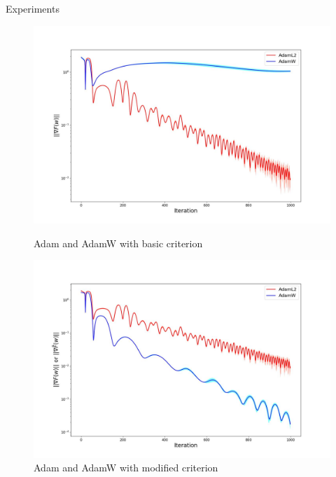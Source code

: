 \documentclass[aspectratio=169, 12pt]{beamer}
\begin{document}
\begin{frame}{Experiments}
\begin{figure}[H]
\begin{minipage}[h]{0.49\linewidth}
\centering

\includegraphics[width=\linewidth]{fig1.jpg}

\caption{Adam and AdamW with basic criterion}
\label{fig:adams_errors}
\end{minipage}
\hfill
\begin{minipage}[h]{0.49\linewidth}
\includegraphics[width=\linewidth]{fig2.jpg}
\caption{Adam and AdamW with modified criterion}
\label{fig:adams_special_errors}
\end{minipage}
\end{figure}
\end{frame}
\end{document}
